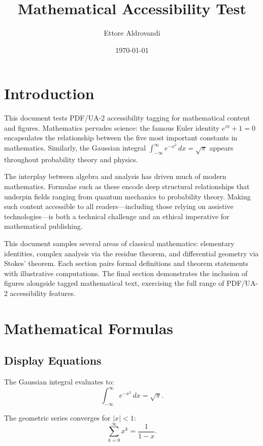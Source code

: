 \documentclass{article}
\begin{document}
\title{Mathematical Accessibility Test}
\author{Ettore Aldrovandi}
\date{\today}
\maketitle

\section{Introduction}

This document tests PDF/UA-2 accessibility tagging for mathematical content and figures.
Mathematics pervades science: the famous Euler identity $e^{i\pi} + 1 = 0$ encapsulates
the relationship between the five most important constants in mathematics.  Similarly,
the Gaussian integral
$\int_{-\infty}^{\infty} e^{-x^2}\,dx = \sqrt{\pi}$
appears throughout probability theory and physics.

The interplay between algebra and analysis has driven much of modern mathematics.
Formulae such as these encode deep structural relationships that underpin fields
ranging from quantum mechanics to probability theory. Making such content accessible
to all readers---including those relying on assistive technologies---is both a
technical challenge and an ethical imperative for mathematical publishing.

This document samples several areas of classical mathematics: elementary identities,
complex analysis via the residue theorem, and differential geometry via Stokes'
theorem. Each section pairs formal definitions and theorem statements with illustrative
computations. The final section demonstrates the inclusion of figures alongside tagged
mathematical text, exercising the full range of PDF/UA-2 accessibility features.

\section{Mathematical Formulas}

\subsection{Display Equations}

The Gaussian integral evaluates to:
\begin{equation}
  \int_{-\infty}^{\infty} e^{-x^2}\,dx = \sqrt{\pi}.
\end{equation}

The geometric series converges for $|x| < 1$:
\begin{equation}
  \sum_{k=0}^{\infty} x^k = \frac{1}{1-x}.
\end{equation}
\end{document}
